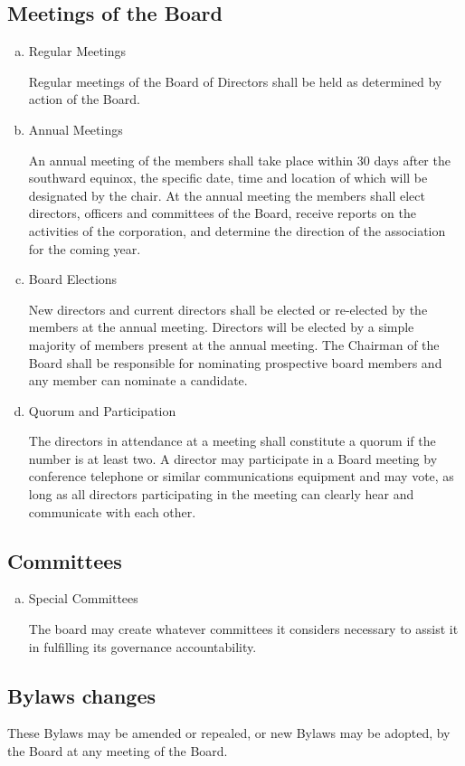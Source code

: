 \subsection{Meetings of the Board}
\begin{enumerate}[(a)]
\item Regular Meetings

Regular meetings of the Board of Directors shall be held as determined by action of the Board.

\item Annual Meetings

An annual meeting of the members shall take place within 30 days after the southward equinox, the specific date, time and location of which will be designated by the chair. At the annual meeting the members shall elect directors, officers and committees of the Board, receive reports on the activities of the corporation, and determine the direction of the association for the coming year.

\item Board Elections

New directors and current directors shall be elected or re-elected by the members at the annual meeting. Directors will be elected by a simple majority of members present at the annual meeting. The Chairman of the Board shall be responsible for nominating prospective board members and any member can nominate a candidate. 

\item Quorum and Participation

The directors in attendance at a meeting shall constitute a quorum if the number is at least two. A director may participate in a Board meeting by conference telephone or similar communications equipment and may vote, as long as all directors participating in the meeting can clearly hear and communicate with each other.

\end{enumerate}

\subsection{Committees}
\begin{enumerate}[(a)]
\item Special Committees

The board may create whatever committees it considers necessary to assist it in fulfilling its governance accountability.

\end{enumerate}
    
\subsection{Bylaws changes}

These Bylaws may be amended or repealed, or new Bylaws may be adopted, by the Board at any meeting of the Board.

    
    
    
    
    
    
    
    
    